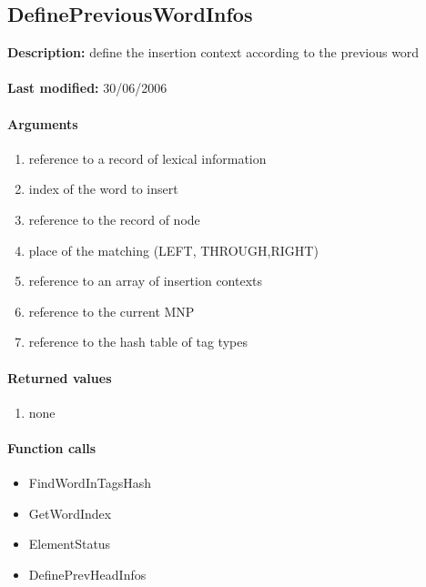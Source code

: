 \subsection{DefinePreviousWordInfos}
\textbf{Description:} define the insertion context according to the previous word\\
\\\textbf{Last modified:} 30/06/2006

\paragraph{Arguments}
\begin{enumerate}
\item reference to a record of lexical information
\item index of the word to insert
\item reference to the record of node
\item place of the matching (LEFT, THROUGH,RIGHT)
\item reference to an array of insertion contexts
\item reference to the current MNP
\item reference to the hash table of tag types
\end{enumerate}

\paragraph{Returned values}
\begin{enumerate}
\item none
\end{enumerate}

\paragraph{Function calls}
\begin{itemize}
\item FindWordInTagsHash
\item GetWordIndex
\item ElementStatus
\item DefinePrevHeadInfos
\end{itemize}

